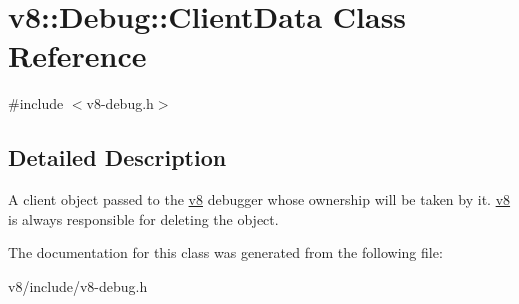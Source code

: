 \hypertarget{classv8_1_1Debug_1_1ClientData}{}\section{v8\+:\+:Debug\+:\+:Client\+Data Class Reference}
\label{classv8_1_1Debug_1_1ClientData}


{\ttfamily \#include $<$v8-\/debug.\+h$>$}



\subsection{Detailed Description}
A client object passed to the \hyperlink{namespacev8}{v8} debugger whose ownership will be taken by it. \hyperlink{namespacev8}{v8} is always responsible for deleting the object. 

The documentation for this class was generated from the following file\+:\begin{DoxyCompactItemize}
\item 
v8/include/v8-\/debug.\+h\end{DoxyCompactItemize}
